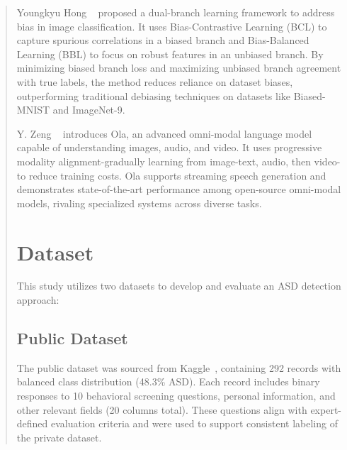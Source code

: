 \documentclass[runningheads]{llncs}
\begin{document}
\begin{abstract}

Youngkyu Hong ~\cite{b9} proposed a dual-branch learning framework to address bias in image classification. It uses Bias-Contrastive Learning (BCL) to capture spurious correlations in a biased branch and Bias-Balanced Learning (BBL) to focus on robust features in an unbiased branch. By minimizing biased branch loss and maximizing unbiased branch agreement with true labels, the method reduces reliance on dataset biases, outperforming traditional debiasing techniques on datasets like Biased-MNIST and ImageNet-9.

Y. Zeng ~\cite{b10} introduces Ola, an advanced omni-modal language model capable of understanding images, audio, and video. It uses progressive modality alignment-gradually learning from image-text, audio, then video-to reduce training costs. Ola supports streaming speech generation and demonstrates state-of-the-art performance among open-source omni-modal models, rivaling specialized systems across diverse tasks.

\section{Dataset}

This study utilizes two datasets to develop and evaluate an ASD detection approach:

\subsection*{Public Dataset}
The public dataset was sourced from Kaggle~\cite{b17}, containing 292 records with balanced class distribution (48.3\% ASD). Each record includes binary responses to 10 behavioral screening questions, personal information, and other relevant fields (20 columns total). These questions align with expert-defined evaluation criteria and were used to support consistent labeling of the private dataset.


\end{abstract}
\end{document}
